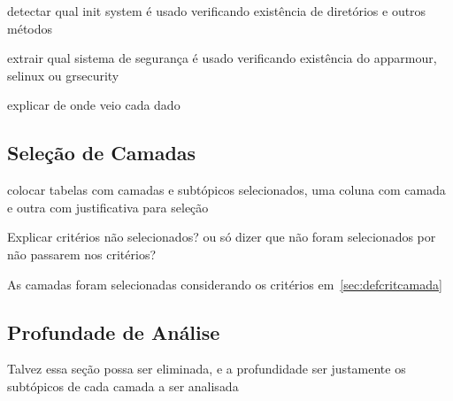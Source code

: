 {\color{red} detectar qual init system é usado verificando existência de diretórios
e outros métodos}

{\color{red} extrair qual sistema de segurança é usado verificando existência
do apparmour, selinux ou grsecurity}

{\color{red} explicar de onde veio cada dado}


\subsection{Seleção de Camadas}
\label{sec:sel-cam}

{\color{red} colocar tabelas com camadas e subtópicos selecionados, uma coluna 
com camada e outra com justificativa para seleção}

{\color{red} Explicar critérios não selecionados? ou só dizer que não foram selecionados
por não passarem nos critérios?}


As camadas foram selecionadas considerando os critérios em~\ref{sec:defcritcamada}

\subsection{Profundade de Análise}


{\color{red} Talvez essa seção possa ser eliminada, e a profundidade ser
justamente os subtópicos de cada camada a ser analisada}
